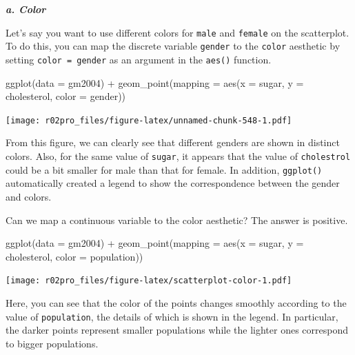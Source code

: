 \documentclass[
]{book}
\newenvironment{Shaded}{\begin{snugshade}}{\end{snugshade}}
\newcommand{\AttributeTok}[1]{\textcolor[rgb]{0.77,0.63,0.00}{#1}}
\newcommand{\FunctionTok}[1]{\textcolor[rgb]{0.00,0.00,0.00}{#1}}
\newcommand{\NormalTok}[1]{#1}
\newcommand{\SpecialCharTok}[1]{\textcolor[rgb]{0.00,0.00,0.00}{#1}}
\begin{document}
\textbf{\emph{a. Color}}

Let's say you want to use different colors for \texttt{male} and \texttt{female} on the scatterplot. To do this, you can map the discrete variable \texttt{gender} to the \texttt{color} aesthetic by setting \texttt{color\ =\ gender} as an argument in the \texttt{aes()} function.

\begin{Shaded}
\begin{Highlighting}[]
\FunctionTok{ggplot}\NormalTok{(}\AttributeTok{data =}\NormalTok{ gm2004) }\SpecialCharTok{+} 
  \FunctionTok{geom\_point}\NormalTok{(}\AttributeTok{mapping =} \FunctionTok{aes}\NormalTok{(}\AttributeTok{x =}\NormalTok{ sugar, }
                           \AttributeTok{y =}\NormalTok{ cholesterol,}
                           \AttributeTok{color =}\NormalTok{ gender))}
\end{Highlighting}
\end{Shaded}

\texttt{[image: r02pro\_files/figure-latex/unnamed-chunk-548-1.pdf]}

From this figure, we can clearly see that different genders are shown in distinct colors. Also, for the same value of \texttt{sugar}, it appears that the value of \texttt{cholestrol} could be a bit smaller for male than that for female. In addition, \texttt{ggplot()} automatically created a legend to show the correspondence between the gender and colors.

Can we map a continuous variable to the color aesthetic? The answer is positive.

\begin{Shaded}
\begin{Highlighting}[]
\FunctionTok{ggplot}\NormalTok{(}\AttributeTok{data =}\NormalTok{ gm2004) }\SpecialCharTok{+} 
  \FunctionTok{geom\_point}\NormalTok{(}\AttributeTok{mapping =} \FunctionTok{aes}\NormalTok{(}\AttributeTok{x =}\NormalTok{ sugar, }
                           \AttributeTok{y =}\NormalTok{ cholesterol,}
                           \AttributeTok{color =}\NormalTok{ population))}
\end{Highlighting}
\end{Shaded}

\texttt{[image: r02pro\_files/figure-latex/scatterplot-color-1.pdf]}

Here, you can see that the color of the points changes smoothly according to the value of \texttt{population}, the details of which is shown in the legend. In particular, the darker points represent smaller populations while the lighter ones correspond to bigger populations.
\end{document}
